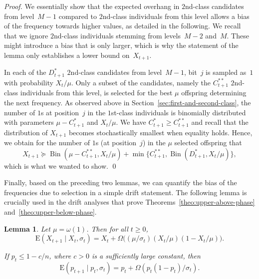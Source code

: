 \documentclass[11pt, a4paper]{article}
\newtheorem{lemma}{Lemma}
\newcommand*{\E}{\mathrm{E}}
\DeclareMathOperator{\Bin}{Bin}
\begin{document}
\begin{proof}
		We essentially show that 
		the expected overhang in $2$nd-class candidates from level~$M-1$ compared to 
		$2$nd-class individuals from this level 
		allows a bias of the frequency towards higher values, as detailed in the following. We recall that we ignore 
		$2$nd-class individuals stemming from levels~$M-2$ and~$M$. These might introduce a bias that is only 
		larger, which is why the statement of the lemma only establishes a lower bound on~$X_{t+1}$. 
		
		
    In each of the $D^*_{t+1}$ $2$nd-class candidates from level~$M-1$, 
		bit~$j$ is sampled as~$1$ with probability $X_t/\mu$. Only 
		a subset of the candidates, namely the $C^{**}_{t+1}$ $2$nd-class individuals from this level,
		is selected for the best $\mu$ offspring determining 
		the next frequency. As observed above in Section~\ref{sec:first-and-second-class}, the number of $1$s at position~$j$ in the $1$st-class individuals 
		is binomially distributed with parameters $\mu-C^*_{t+1}$ and $X_t/\mu$. We have $C_{t+1}^{*}\ge C^{**}_{t+1}$ and recall  
		that the distribution of $X_{t+1}$ becomes stochastically smallest when equality holds. 
    Hence, we obtain for the number of $1$s (at position~$j$) in the $\mu$ selected offspring that 
		\[
		X_{t+1}\succeq \Bin(\mu-C^{**}_{t+1},X_t/\mu)+\min\{C^{**}_{t+1},\Bin(D^*_{t+1},X_t/\mu)\},
		\]
		which is what we wanted to show.
		\qed\end{proof}
		
		
		Finally, based on the preceding two lemmas, we can quantify the bias 
		of the frequencies due to selection in a simple drift statement. The following lemma is crucially used in the 
		drift analyses that prove Theorems~\ref{theo:upper-above-phase} and~\ref{theo:upper-below-phase}.
		
		
\begin{lemma}
\label{lem:2nd-lower-part-3}
Let $\mu=\omega(1)$. Then 
for all $t\ge 0$, 
 \[\E(X_{t+1}\mid X_t,\sigma_t) = X_t + \Omega\bigl((\mu/\sigma_t)(X_t/\mu)(1-X_t/\mu)\bigr	).\]		

If $p_t\le 1-c/n$, where $c>0$ is a sufficiently large constant, then 
 \[\E(p_{t+1}\mid p_t,\sigma_t) = p_t + \Omega(p_t(1-p_t)/\sigma_t).\]
\end{lemma}
\end{document}
